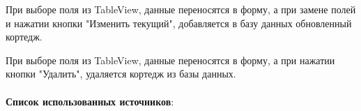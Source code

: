 \documentclass[12pt, a4paper, simple]{eskdtext}
\begin{document}
    При выборе поля из TableView, данные переносятся в форму, а при замене полей и нажатии кнопки "Изменить текущий",
    добавляется в базу данных обновленный кортедж.

    При выборе поля из TableView, данные переносятся в форму, а при нажатии кнопки "Удалить",
    удаляется кортедж из базы данных. 

    \paragraph{} \textbf{Список использованных источников}:
\end{document}
